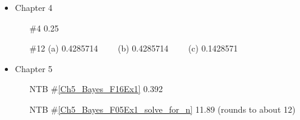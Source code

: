 \documentclass[12pt]{article}
\begin{document}
\begin{itemize}
\item Chapter 4          \label{ANS_4}
	\begin{itemize}
	\item[\#4] 0.25
	\item[\#12]   (a) 0.4285714  \ \ \ \ (b) 0.4285714 \ \ \ \ (c)  0.1428571
	\end{itemize}

\item Chapter 5           \label{ANS_5}
	\begin{itemize}
	\item[NTB \#\ref{Ch5_Bayes_F16Ex1}]   0.392
	\item[NTB \#\ref{Ch5_Bayes_F05Ex1_solve_for_n}]  11.89 (rounds to about 12)	
	\end{itemize}












\end{itemize}
\end{document}
